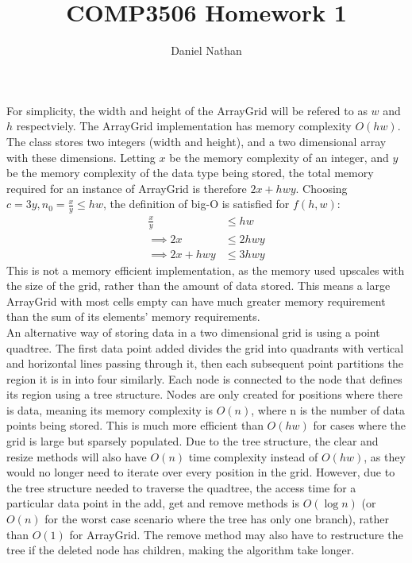 \documentclass{article}
\author{Daniel Nathan}
\title{COMP3506 Homework 1}
\begin{document}
	\maketitle
	For simplicity, the width and height of the ArrayGrid will be refered to as $w$ and $h$ respectviely. The ArrayGrid implementation has memory complexity $O(hw)$. The class stores two integers (width and height), and a two dimensional array with these dimensions. Letting $x$ be the memory complexity of an integer, and $y$ be the memory complexity of the data type being stored, the total memory required for an instance of ArrayGrid is therefore $2x + hwy$. Choosing $c = 3y, n_0 = \frac{x}{y} \le hw$, the definition of big-O is satisfied for $f(h, w)$:
	\begin{align*}
		\frac{x}{y} &\le hw \\
		\implies 2x &\le 2hwy \\
		\implies 2x + hwy &\le 3hwy
	\end{align*}
	This is not a memory efficient implementation, as the memory used upscales with the size of the grid, rather than the amount of data stored. This means a large ArrayGrid with most cells empty can have much greater memory requirement than the sum of its elements' memory requirements.
	\newline \\
	An alternative way of storing data in a two dimensional grid is using a point quadtree. The first data point added divides the grid into quadrants with vertical and horizontal lines passing through it, then each subsequent point partitions the region it is in into four similarly. Each node is connected to the node that defines its region using a tree structure. Nodes are only created for positions where there is data, meaning its memory complexity is $O(n)$, where n is the number of data points being stored. This is much more efficient than $O(hw)$ for cases where the grid is large but sparsely populated. Due to the tree structure, the clear and resize methods will also have $O(n)$ time complexity instead of $O(hw)$, as they would no longer need to iterate over every position in the grid. However, due to the tree structure needed to traverse the quadtree, the access time for a particular data point in the add, get and remove methods is $O(\log n)$ (or $O(n)$ for the worst case scenario where the tree has only one branch), rather than $O(1)$ for ArrayGrid. The remove method may also have to restructure the tree if the deleted node has children, making the algorithm take longer.
\end{document}
